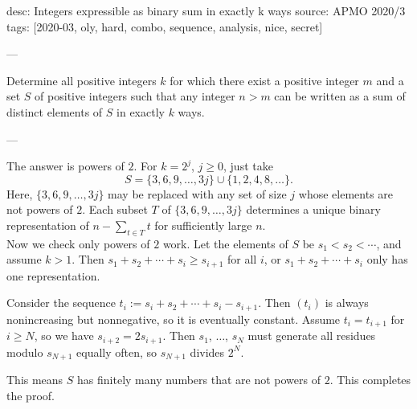 desc: Integers expressible as binary sum in exactly k ways
source: APMO 2020/3
tags: [2020-03, oly, hard, combo, sequence, analysis, nice, secret]

---

Determine all positive integers $k$ for which there exist a positive integer $m$ and a set $S$ of positive integers such that any integer $n>m$ can be written as a sum of distinct elements of $S$ in exactly $k$ ways.

---

The answer is powers of $2$. For $k=2^j$, $j\ge0$, just take \[S=\{3,6,9,\ldots,3j\}\cup\{1,2,4,8,\ldots\}.\]
Here, $\{3,6,9,\ldots,3j\}$ may be replaced with any set of size $j$ whose elements are not powers of $2$. Each subset $T$ of $\{3,6,9,\ldots,3j\}$ determines a unique binary representation of $\textstyle n-\sum_{t\in T}t$ for sufficiently large $n$.\\

Now we check only powers of $2$ work. Let the elements of $S$ be $s_1<s_2<\cdots$, and assume $k>1$. Then $s_1+s_2+\cdots+s_i\ge s_{i+1}$ for all $i$, or $s_1+s_2+\cdots+s_i$ only has one representation.

Consider the sequence $t_i:=s_i+s_2+\cdots+s_i-s_{i+1}$. Then $(t_i)$ is always nonincreasing but nonnegative, so it is eventually constant. Assume $t_i=t_{i+1}$ for $i\ge N$, so we have $s_{i+2}=2s_{i+1}$. Then $s_1$, $\ldots$, $s_N$ must generate all residues modulo $s_{N+1}$ equally often, so $s_{N+1}$ divides $2^N$.

This means $S$ has finitely many numbers that are not powers of $2$. This completes the proof.
